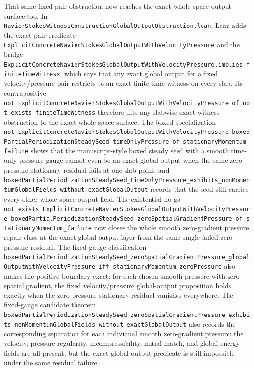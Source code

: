 \documentclass[11pt]{article}
\theoremstyle{remark}
\begin{document}
That same fixed-pair obstruction now reaches the exact whole-space output
surface too.  In
\texttt{NavierStokesWitnessConstructionGlobalOutputObstruction.lean}, Lean adds
the exact-pair predicate
\texttt{ExplicitConcreteNavierStokesGlobalOutputWithVelocityPressure} and the
bridge
\texttt{ExplicitConcreteNavierStokesGlobalOutputWithVelocityPressure.implies\_finiteTimeWitness},
which says that any exact global output for a fixed velocity/pressure pair
restricts to an exact finite-time witness on every slab.  Its contrapositive
\texttt{not\_ExplicitConcreteNavierStokesGlobalOutputWithVelocityPressure\_of\_not\_exists\_finiteTimeWitness}
therefore lifts any slabwise exact-witness obstruction to the exact whole-space
surface.  The boxed specialization
\texttt{not\_ExplicitConcreteNavierStokesGlobalOutputWithVelocityPressure\_boxedPartialPeriodizationSteadySeed\_timeOnlyPressure\_of\_stationaryMomentum\_failure}
shows that the manuscript-style boxed steady seed with a smooth time-only
pressure gauge cannot even be an exact global output when the same
zero-pressure stationary residual fails at one slab point, and
\texttt{boxedPartialPeriodizationSteadySeed\_timeOnlyPressure\_exhibits\_nonMomentumGlobalFields\_without\_exactGlobalOutput}
records that the seed still carries every other whole-space output field.  The
existential no-go
\texttt{not\_exists\_ExplicitConcreteNavierStokesGlobalOutputWithVelocityPressure\_boxedPartialPeriodizationSteadySeed\_zeroSpatialGradientPressure\_of\_stationaryMomentum\_failure}
now closes the whole smooth zero-gradient pressure repair class at the exact
global-output layer from the same single failed zero-pressure residual.  The
fixed-gauge classification
\texttt{boxedPartialPeriodizationSteadySeed\_zeroSpatialGradientPressure\_globalOutputWithVelocityPressure\_iff\_stationaryMomentum\_zeroPressure}
also makes the positive boundary exact: for each chosen smooth pressure with
zero spatial gradient, the fixed velocity/pressure global-output proposition
holds exactly when the zero-pressure stationary residual vanishes everywhere.
The fixed-gauge candidate theorem
\texttt{boxedPartialPeriodizationSteadySeed\_zeroSpatialGradientPressure\_exhibits\_nonMomentumGlobalFields\_without\_exactGlobalOutput}
also records the corresponding separation for each individual smooth
zero-gradient pressure: the velocity, pressure regularity, incompressibility,
initial match, and global energy fields are all present, but the exact
global-output predicate is still impossible under the same residual failure.
\end{document}
